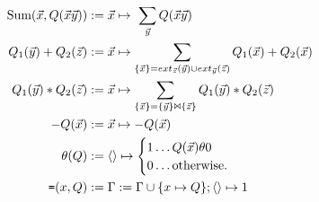 \begin{align*}
\mbox{Sum}(\vec{x}, Q(\vec{x}\vec{y})) := & \;
\vec{x} \mapsto \ \sum_{\vec{y}} Q(\vec{x}\vec{y})
\\
Q_1(\vec{y}) + Q_2(\vec{z}) := & \;
\vec{x} \mapsto 
\sum_{\{\vec{x}\} = ext_{\vec{z}}(\vec{y}) \cup ext_{\vec{y}}(\vec{z})}
Q_1(\vec{x}) + Q_2(\vec{x})
\\
Q_1(\vec{y}) * Q_2(\vec{z}) := & \;
\vec{x} \mapsto \sum_{ \{\vec{x}\} = \{\vec{y}\} \Join \{\vec{z}\} }
Q_1(\vec{y}) * Q_2(\vec{z})
\\
-Q(\vec{x}) := & \; \vec{x} \mapsto -Q(\vec{x})
\\
\theta(Q) := & \; {\langle\rangle} \mapsto
                    \begin{cases}
                    1 \ldots Q(\vec{x}) \theta 0\\
                    0 \ldots \mbox{otherwise.}
                    \end{cases}
\\
\mbox{{\tt =}}(x,Q) := & \; \Gamma := \Gamma \cup \{x \mapsto Q\};
                  {\langle\rangle} \mapsto 1
\end{align*}

